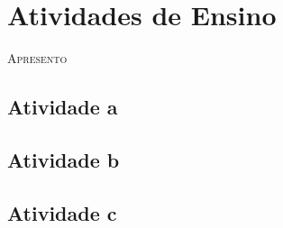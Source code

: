 \chapter{Atividades de Ensino}


% 

\lettrine[lines=2, lhang=0.33, loversize=0.25, findent=1.5em]{A}{presento} 
\lipsum[50]


\section{Atividade a}
\lipsum[60]

\lipsum[61]

\lipsum[62]

\section{Atividade b}
\lipsum[63]

\lipsum[65]

\lipsum[66]

\section{Atividade c}

\lipsum[64]

\lipsum[67]

\lipsum[68]